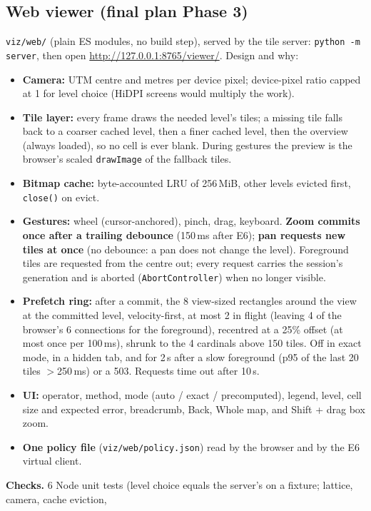 ﻿\documentclass[11pt,a4paper]{article}
\newcommand{\code}[1]{\texttt{#1}}
\begin{document}
\subsection{Web viewer (final plan Phase 3)}\label{sec:p5viewer}
\code{viz/web/} (plain ES modules, no build step), served by the tile server: \code{python -m server}, then open
\url{http://127.0.0.1:8765/viewer/}. Design and why:
\begin{itemize}
  \item \textbf{Camera:} UTM centre and metres per device pixel; device-pixel ratio capped at 1 for level choice
  (HiDPI screens would multiply the work).
  \item \textbf{Tile layer:} every frame draws the needed level's tiles; a missing tile falls back to a coarser cached
  level, then a finer cached level, then the overview (always loaded), so no cell is ever blank. During gestures the
  preview is the browser's scaled \code{drawImage} of the fallback tiles.
  \item \textbf{Bitmap cache:} byte-accounted LRU of 256\,MiB, other levels evicted first, \code{close()} on evict.
  \item \textbf{Gestures:} wheel (cursor-anchored), pinch, drag, keyboard. \textbf{Zoom commits once after a trailing
  debounce} (150\,ms after E6); \textbf{pan requests new tiles at once} (no debounce: a pan does not change the
  level). Foreground tiles are requested from the centre out; every request carries the session's generation and is
  aborted (\code{AbortController}) when no longer visible.
  \item \textbf{Prefetch ring:} after a commit, the 8 view-sized rectangles around the view at the committed level,
  velocity-first, at most 2 in flight (leaving 4 of the browser's 6 connections for the foreground), recentred at a
  25\% offset (at most once per 100\,ms), shrunk to the 4 cardinals above 150 tiles. Off in exact mode, in a hidden tab,
  and for 2\,s after a slow foreground (p95 of the last 20 tiles $>$250\,ms) or a 503. Requests time out after 10\,s.
  \item \textbf{UI:} operator, method, mode (auto / exact / precomputed), legend, level, cell size and expected error,
  breadcrumb, Back, Whole map, and Shift + drag box zoom.
  \item \textbf{One policy file} (\code{viz/web/policy.json}) read by the browser and by the E6 virtual client.
\end{itemize}
\textbf{Checks.} 6 Node unit tests (level choice equals the server's on a fixture; lattice, camera, cache eviction,
\end{document}
